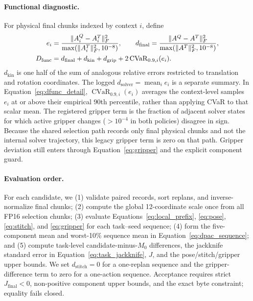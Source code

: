 \paragraph{Functional diagnostic.}
For physical final chunks indexed by context $i$, define
\begin{equation}
\begin{aligned}
 e_i&=\frac{\lVert A_i^Q-A_i^T\rVert_F^2}
 {\max(\lVert A_i^T\rVert_F^2,10^{-8})},\qquad
 d_{\mathrm{final}}=\frac{\lVert A^Q-A^T\rVert_F^2}
 {\max(\lVert A^T\rVert_F^2,10^{-8})},\\
 D_{\mathrm{func}}&=d_{\mathrm{final}}+d_{\mathrm{kin}}+d_{\mathrm{grip}}
 +2\operatorname{CVaR}_{0.9,i}(e_i).
\end{aligned}
\label{eq:dfunc_detail}
\end{equation}
$d_{\mathrm{kin}}$ is one half of the sum of analogous relative errors restricted to translation and rotation coordinates. The logged $d_{\mathrm{solver}}=\operatorname{mean}_i e_i$ is a separate summary. In Equation~\ref{eq:dfunc_detail}, $\operatorname{CVaR}_{0.9,i}(e_i)$ averages the context-level samples $e_i$ at or above their empirical 90th percentile, rather than applying CVaR to that scalar mean. The registered \dfunc gripper term is the fraction of adjacent solver states for which active gripper changes ($>10^{-4}$ in both policies) disagree in sign. Because the shared selection path records only final physical chunks and not the internal solver trajectory, this legacy \dfunc gripper term is zero on that path. Gripper deviation still enters \dpac through Equation~\ref{eq:gripper} and the explicit component guard.

\paragraph{Evaluation order.}
For each candidate, we (1) validate paired records, sort replans, and inverse-normalize final chunks; (2) compute the global 12-coordinate scale once from all FP16 selection chunks; (3) evaluate Equations~\ref{eq:local_prefix}, \ref{eq:pose}, \ref{eq:stitch}, and \ref{eq:gripper} for each task--seed sequence; (4) form the five-component mean and worst-10\% sequence mean in Equation~\ref{eq:dpac_sequence}; and (5) compute task-level candidate-minus-$M_0$ differences, the jackknife standard error in Equation~\ref{eq:task_jackknife}, $J$, and the pose/stitch/gripper upper bounds. We set $d_{\mathrm{stitch}}=0$ for a one-replan sequence and the gripper-difference term to zero for a one-action sequence. Acceptance requires strict $J_{\mathrm{final}}<0$, non-positive component upper bounds, and the exact byte constraint; equality fails closed.

